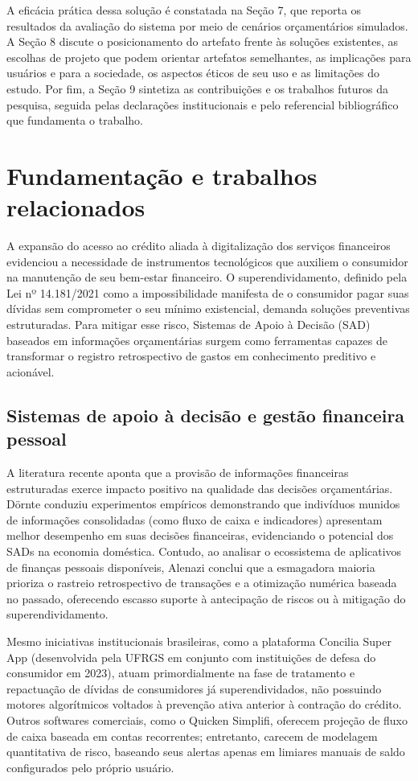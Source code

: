 \documentclass[portuguese]{sbc2025}%
\begin{document}
A eficácia prática dessa solução é constatada na Seção 7, que reporta os resultados da avaliação do sistema por meio de cenários orçamentários simulados. A Seção 8 discute o posicionamento do artefato frente às soluções existentes, as escolhas de projeto que podem orientar artefatos semelhantes, as implicações para usuários e para a sociedade, os aspectos éticos de seu uso e as limitações do estudo. Por fim, a Seção 9 sintetiza as contribuições e os trabalhos futuros da pesquisa, seguida pelas declarações institucionais e pelo referencial bibliográfico que fundamenta o trabalho.

\section{Fundamentação e trabalhos relacionados}
A expansão do acesso ao crédito aliada à digitalização dos serviços financeiros evidenciou a necessidade de instrumentos tecnológicos que auxiliem o consumidor na manutenção de seu bem-estar financeiro. O superendividamento, definido pela Lei nº 14.181/2021 como a impossibilidade manifesta de o consumidor pagar suas dívidas sem comprometer o seu mínimo existencial, demanda soluções preventivas estruturadas. Para mitigar esse risco, Sistemas de Apoio à Decisão (SAD) baseados em informações orçamentárias surgem como ferramentas capazes de transformar o registro retrospectivo de gastos em conhecimento preditivo e acionável.

\subsection{Sistemas de apoio à decisão e gestão financeira pessoal}
A literatura recente aponta que a provisão de informações financeiras estruturadas exerce impacto positivo na qualidade das decisões orçamentárias. Dörnte \citeyearpar{dornte2021} conduziu experimentos empíricos demonstrando que indivíduos munidos de informações consolidadas (como fluxo de caixa e indicadores) apresentam melhor desempenho em suas decisões financeiras, evidenciando o potencial dos SADs na economia doméstica. Contudo, ao analisar o ecossistema de aplicativos de finanças pessoais disponíveis, Alenazi \citeyearpar{alenazi2026} conclui que a esmagadora maioria prioriza o rastreio retrospectivo de transações e a otimização numérica baseada no passado, oferecendo escasso suporte à antecipação de riscos ou à mitigação do superendividamento.

Mesmo iniciativas institucionais brasileiras, como a plataforma Concilia Super App (desenvolvida pela UFRGS em conjunto com instituições de defesa do consumidor em 2023), atuam primordialmente na fase de tratamento e repactuação de dívidas de consumidores já superendividados, não possuindo motores algorítmicos voltados à prevenção ativa anterior à contração do crédito. Outros softwares comerciais, como o Quicken Simplifi, oferecem projeção de fluxo de caixa baseada em contas recorrentes; entretanto, carecem de modelagem quantitativa de risco, baseando seus alertas apenas em limiares manuais de saldo configurados pelo próprio usuário.
\end{document}
